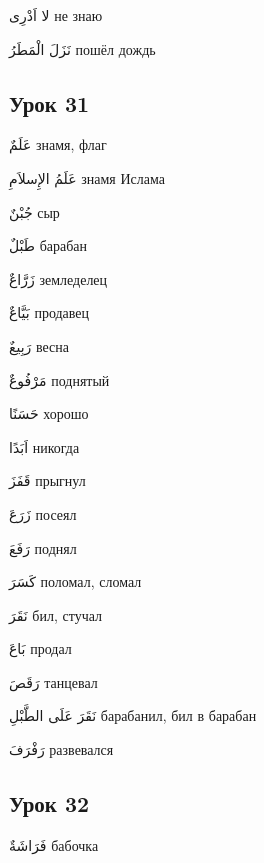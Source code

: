 \documentclass[a5paper]{article}
\newcommand\textstyleDropCaps[1]{#1}
\newcommand\textstyleCaptioncharacters[1]{#1}
\begin{document}
\textstyleCaptioncharacters{لا اَدْرِى }\textstyleDropCaps{не знаю‎}

\textstyleCaptioncharacters{نَزَلَ الْمَطَرُ }\textstyleDropCaps{пошёл дождь‎}

\subsection[Урок 31‎]{\textstyleDropCaps{Урок 31‎}}
\textstyleCaptioncharacters{عَلَمٌ }\textstyleDropCaps{знамя, флаг‎}

\textstyleCaptioncharacters{عَلَمُ الإِسلاَمِ }\textstyleDropCaps{знамя Исла­ма‎}

\textstyleCaptioncharacters{جُبْنٌ }\textstyleDropCaps{сыр‎}

\textstyleCaptioncharacters{طَبْلٌ }\textstyleDropCaps{барабан‎}

\textstyleCaptioncharacters{زَرَّاعٌ }\textstyleDropCaps{земледелец‎}

\textstyleCaptioncharacters{بَيَّاعٌ }\textstyleDropCaps{продавец‎}

\textstyleCaptioncharacters{رَبِيعٌ }\textstyleDropCaps{весна‎}

\textstyleCaptioncharacters{مَرْفُوعٌ }\textstyleDropCaps{поднятый‎}

\textstyleCaptioncharacters{حَسَنًا }\textstyleDropCaps{хорошо‎}

\textstyleCaptioncharacters{اَبَدًا }\textstyleDropCaps{никогда‎}

\textstyleCaptioncharacters{قَفَزَ }\textstyleDropCaps{прыгнул‎}

\textstyleCaptioncharacters{زَرَعَ }\textstyleDropCaps{посеял‎}

\textstyleCaptioncharacters{رَفَعَ }\textstyleDropCaps{поднял‎}

\textstyleCaptioncharacters{كَسَرَ }\textstyleDropCaps{поломал, сломал‎}

\textstyleCaptioncharacters{نَقَرَ }\textstyleDropCaps{бил, стучал‎}

\textstyleCaptioncharacters{بَاعَ }\textstyleDropCaps{продал‎}

\textstyleCaptioncharacters{رَقَصَ }\textstyleDropCaps{танцевал‎}

\textstyleCaptioncharacters{نَقَرَ عَلَى الطَّبْلِ }\textstyleDropCaps{барабан­ил, бил в барабан‎}

\textstyleCaptioncharacters{رَفْرَفَ }\textstyleDropCaps{развевался‎}

\subsection[Урок 32‎]{\textstyleDropCaps{Урок 32‎}}
\textstyleCaptioncharacters{فَرَاشَةٌ }\textstyleDropCaps{бабочка‎}
\end{document}
